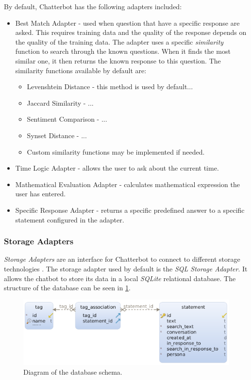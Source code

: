 \documentclass[12pt,a4paper]{article}
\newcommand{\captionstyle}[1] {
    \small{#1}
}
\begin{document}
By default, Chatterbot has the following adapters included:
\begin{itemize}
    \item Best Match Adapter - used when question that have a specific response are asked. This requires training data and the quality of the response depends on the quality of the training data. The adapter uses a specific \textit{similarity} function to search through the known questions. When it finds the most similar one, it then returns the known response to this question. The similarity functions available by default are:
        \begin{itemize}
            \item Levenshtein Distance - this method is used by default...
            \item Jaccard Similarity - ...
            \item Sentiment Comparison - ...
            \item Synset Distance - ...
            \item Custom similarity functions may be implemented if needed.
        \end{itemize}
    \item Time Logic Adapter - allows the user to ask about the current time.
    \item Mathematical Evaluation Adapter - calculates mathematical expression the user has entered.
    \item Specific Response Adapter - returns a specific predefined answer to a specific statement configured in the adapter.
\end{itemize}

\subsubsection{Storage Adapters}
\textit{Storage Adapters} are an interface for Chatterbot to connect to different storage technologies \cite{Chatterbot:online}. The storage adapter used by default is the \textit{SQL Storage Adapter}. It allows the chatbot to store its data in a local \textit{SQLite} relational database. The structure of the database can be seen in \cref{fig:db-schema}.

\begin{figure}[!htb]%
    \centering
    \includegraphics[width=0.9\columnwidth]{db-schema}%
    \caption{\captionstyle{Diagram of the database schema.}}%
    \label{fig:db-schema}%
\end{figure}
\end{document}
